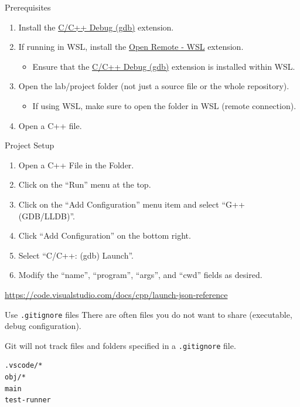 \documentclass[14pt,aspectratio=1610]{beamer}
\begin{document}
\begin{frame}{Prerequisites}
  \begin{enumerate}
    \item Install the \href{https://open-vsx.org/extension/KylinIdeTeam/cppdebug}{C/C++ Debug (gdb)} extension.

    \item If running in WSL, install the \href{https://open-vsx.org/extension/jeanp413/open-remote-wsl}{Open Remote - WSL} extension.
    
      \begin{itemize}
        \item Ensure that the \href{https://open-vsx.org/extension/KylinIdeTeam/cppdebug}{C/C++ Debug (gdb)} extension is installed within WSL\@.
      \end{itemize}

    \item Open the lab/project folder (not just a source file or the whole repository).
    
      \begin{itemize}
        \item If using WSL, make sure to open the folder in WSL (remote connection).
      \end{itemize}

    \item Open a C++ file.
  \end{enumerate}
\end{frame}

\begin{frame}{Project Setup}
  \begin{enumerate}\setlength\itemsep{0.5em}
    \item Open a C++ File in the Folder.
    \item Click on the ``Run'' menu at the top.
    \item Click on the ``Add Configuration'' menu item and select ``G++ (GDB/LLDB)''.
    \item Click ``Add Configuration'' on the bottom right.
    \item Select ``C/C++: (gdb) Launch''.
    \item Modify the ``name'', ``program'', ``args'', and ``cwd'' fields as desired.
  \end{enumerate}
  {\footnotesize\url{https://code.visualstudio.com/docs/cpp/launch-json-reference}}
\end{frame}

\begin{frame}[fragile]{Use \texttt{.gitignore} files}
  There are often files you do not want to share (executable, debug configuration).

  Git will not track files and folders specified in a \texttt{.gitignore} file.
\begin{lstlisting}[language={}]
.vscode/*
obj/*
main
test-runner
\end{lstlisting}
\end{frame}
\end{document}
